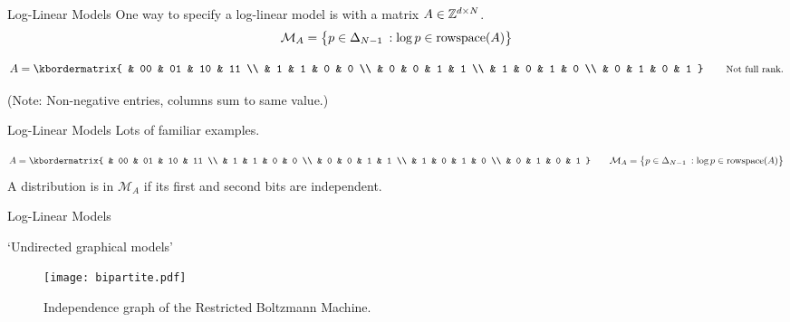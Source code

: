 \documentclass[xcolor=dvipsnames]{beamer}
\newcommand*{\as}{A}
\newcommand*{\ms}{\mathcal M}
\begin{document}
\begin{frame}{Log-Linear Models}
    \lspace
    One way to specify a log-linear model is with a matrix $\as \in \Z^{d
    \times N}$.
    \[
        \ms_\as = \cdel[\big]{ p \in \Delta_{N-1}
        \:: \log p  \in \mathrm{rowspace}(\as)}
    \]

    \pause
    \begin{example}
    \[
        \as = \kbordermatrix{
            & 00 & 01 & 10 & 11 \\
            &  1 & 1  & 0  & 0 \\
            &  0 & 0  & 1  & 1 \\
            &  1 & 0  & 1  & 0 \\
            &  0 & 1  & 0  & 1
        }
        \qquad
        \text{\footnotesize Not full rank.}
    \]
    \end{example}

    {\footnotesize
        (Note: Non-negative entries, columns sum to same value.)
    }
\end{frame}

\begin{frame}{Log-Linear Models}
    Lots of familiar examples.
    \begin{example}
    \[
        \as = \kbordermatrix{
            & 00 & 01 & 10 & 11 \\
            &  1 & 1  & 0  & 0 \\
            &  0 & 0  & 1  & 1 \\
            &  1 & 0  & 1  & 0 \\
            &  0 & 1  & 0  & 1
        }
        \qquad
        \ms_\as = \cdel[\big]{ p \in \Delta_{N-1}
        \:: \log p  \in \mathrm{rowspace}(\as)}
    \]
    A distribution is in $\ms_\as$ if its first and second bits are independent.
    \end{example}
\end{frame}

\begin{frame}{Log-Linear Models}
    \begin{example}
    `Undirected graphical models'
    \begin{figure}\centering
        \texttt{[image: bipartite.pdf]} 
        \caption{Independence graph of the Restricted Boltzmann
        Machine.}
    \end{figure}
    \end{example}
\end{frame}
\end{document}
